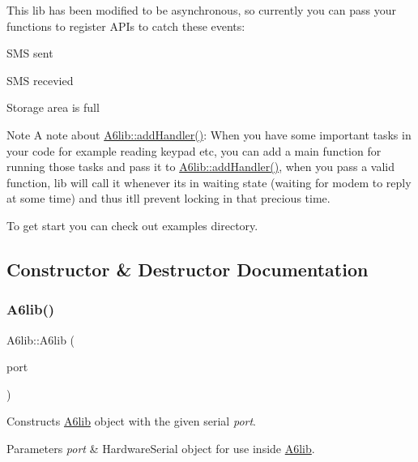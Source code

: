 This lib has been modified to be asynchronous, so currently you can pass your functions to register A\+P\+Is to catch these events\+:
\begin{DoxyEnumerate}
\item S\+MS sent
\item S\+MS recevied
\item Storage area is full
\end{DoxyEnumerate}

\begin{DoxyNote}{Note}
A note about \mbox{\hyperlink{class_a6lib_ab9580c0720252ad9e2d6b67683e3e88f}{A6lib\+::add\+Handler()}}\+: When you have some important tasks in your code for example reading keypad etc, you can add a main function for running those tasks and pass it to \mbox{\hyperlink{class_a6lib_ab9580c0720252ad9e2d6b67683e3e88f}{A6lib\+::add\+Handler()}}, when you pass a valid function, lib will call it whenever it\textquotesingle{}s in waiting state (waiting for modem to reply at some time) and thus it\textquotesingle{}ll prevent locking in that precious time.
\end{DoxyNote}
To get start you can check out examples directory. 

\subsection{Constructor \& Destructor Documentation}
\mbox{\label{class_a6lib_a5cbcf78590cf824bfaa16b181b6ac4a1}} 
\subsubsection{\texorpdfstring{A6lib()}{A6lib()}\hspace{0.1cm}{\footnotesize\ttfamily [1/3]}}
{\footnotesize\ttfamily A6lib\+::\+A6lib (\begin{DoxyParamCaption}\item[{Hardware\+Serial $\ast$}]{port }\end{DoxyParamCaption})}

Constructs \mbox{\hyperlink{class_a6lib}{A6lib}} object with the given serial {\itshape port}. 
\begin{DoxyParams}{Parameters}
{\em port} & Hardware\+Serial object for use inside \mbox{\hyperlink{class_a6lib}{A6lib}}. \\
\hline
\end{DoxyParams}
\mbox{\label{class_a6lib_a415ffc3dc0178a4ee8fdf3e718ef14a9}} 
